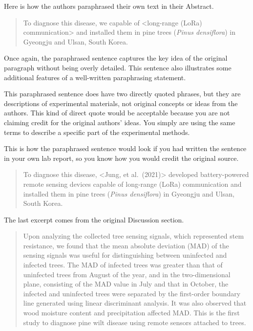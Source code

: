 \documentclass[
]{book}
\begin{document}
Here is how the authors paraphrased their own text in their Abstract.

\begin{quote}
To diagnose this disease, we capable of \textless long-range (LoRa) communication\textgreater{} and installed them in pine trees (\emph{Pinus densiflora}) in Gyeongju and Ulsan, South Korea.
\end{quote}

Once again, the paraphrased sentence captures the key idea of the original paragraph without being overly detailed. This sentence also illustrates some additional features of a well-written paraphrasing statement.

This paraphrased sentence does have two directly quoted phrases, but they are descriptions of experimental materials, not original concepts or ideas from the authors. This kind of direct quote would be acceptable because you are not claiming credit for the original authors' ideas. You simply are using the same terms to describe a specific part of the experimental methods.

This is how the paraphrased sentence would look if you had written the sentence in your own lab report, so you know how you would credit the original source.

\begin{quote}
To diagnose this disease, \textless Jung, et al.~(2021)\textgreater{} developed battery-powered remote sensing devices capable of long-range (LoRa) communication and installed them in pine trees (\emph{Pinus densiflora}) in Gyeongju and Ulsan, South Korea.
\end{quote}

The last excerpt comes from the original Discussion section.

\begin{quote}
Upon analyzing the collected tree sensing signals, which represented stem resistance, we found that the mean absolute deviation (MAD) of the sensing signals was useful for distinguishing between uninfected and infected trees. The MAD of infected trees was greater than that of uninfected trees from August of the year, and in the two-dimensional plane, consisting of the MAD value in July and that in October, the infected and uninfected trees were separated by the first-order boundary line generated using linear discriminant analysis. It was also observed that wood moisture content and precipitation affected MAD. This is the first study to diagnose pine wilt disease using remote sensors attached to trees.
\end{quote}
\end{document}
